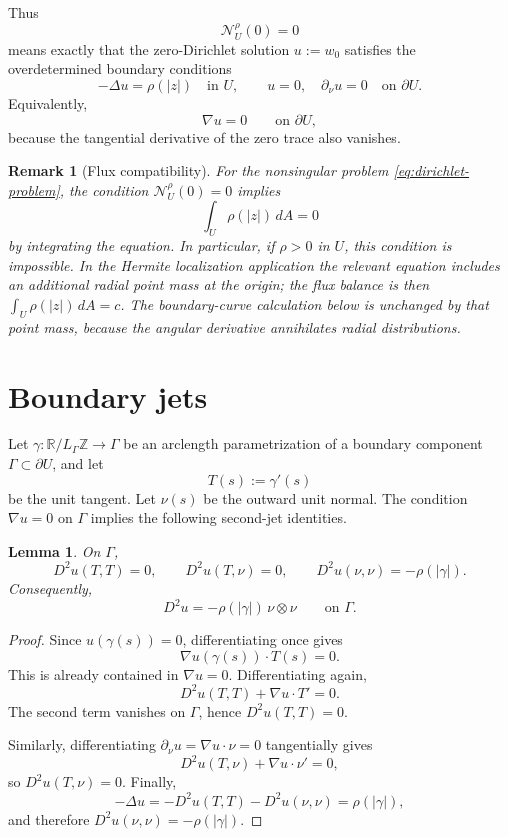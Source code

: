 \documentclass[11pt]{article}
\newtheorem{lemma}[theorem]{Lemma}
\newtheorem{remark}[theorem]{Remark}
\newcommand{\R}{\mathbb R}
\newcommand{\Z}{\mathbb Z}
\newcommand{\dd}{\,d}
\newcommand{\1}{\mathbf 1}
\begin{document}
Thus
\[
  \mathcal N_U^\rho(0)=0
\]
means exactly that the zero-Dirichlet solution \(u:=w_0\) satisfies the
overdetermined boundary conditions
\begin{equation}\label{eq:overdetermined}
  -\Delta u=\rho(|z|)\quad\text{in }U,\qquad
  u=0,\quad \partial_\nu u=0\quad\text{on }\partial U .
\end{equation}
Equivalently,
\[
  \nabla u=0\qquad\text{on }\partial U,
\]
because the tangential derivative of the zero trace also vanishes.

\begin{remark}[Flux compatibility]
For the nonsingular problem \eqref{eq:dirichlet-problem}, the condition
\(\mathcal N_U^\rho(0)=0\) implies
\[
  \int_U \rho(|z|)\dd A=0
\]
by integrating the equation.  In particular, if \(\rho>0\) in \(U\), this
condition is impossible.  In the Hermite localization application the relevant
equation includes an additional radial point mass at the origin; the flux balance
is then \(\int_U\rho(|z|)\dd A=c\).  The boundary-curve calculation below is
unchanged by that point mass, because the angular derivative annihilates radial
distributions.
\end{remark}

\section{Boundary jets}

Let \(\gamma:\R/L_\Gamma\Z\to\Gamma\) be an arclength parametrization of a
boundary component \(\Gamma\subset\partial U\), and let
\[
  T(s):=\gamma'(s)
\]
be the unit tangent.  Let \(\nu(s)\) be the outward unit normal.  The condition
\(\nabla u=0\) on \(\Gamma\) implies the following second-jet identities.

\begin{lemma}\label{lem:hessian}
On \(\Gamma\),
\[
  D^2u(T,T)=0,\qquad D^2u(T,\nu)=0,\qquad D^2u(\nu,\nu)=-\rho(|\gamma|).
\]
Consequently,
\begin{equation}\label{eq:hessian-normal}
  D^2u=-\rho(|\gamma|)\,\nu\otimes\nu
  \qquad\text{on }\Gamma .
\end{equation}
\end{lemma}

\begin{proof}
Since \(u(\gamma(s))=0\), differentiating once gives
\[
  \nabla u(\gamma(s))\cdot T(s)=0.
\]
This is already contained in \(\nabla u=0\).  Differentiating again,
\[
  D^2u(T,T)+\nabla u\cdot T'=0.
\]
The second term vanishes on \(\Gamma\), hence \(D^2u(T,T)=0\).

Similarly, differentiating \(\partial_\nu u=\nabla u\cdot\nu=0\) tangentially gives
\[
  D^2u(T,\nu)+\nabla u\cdot\nu'=0,
\]
so \(D^2u(T,\nu)=0\).  Finally,
\[
  -\Delta u
  =
  -D^2u(T,T)-D^2u(\nu,\nu)
  =
  \rho(|\gamma|),
\]
and therefore \(D^2u(\nu,\nu)=-\rho(|\gamma|)\).
\end{proof}
\end{document}
